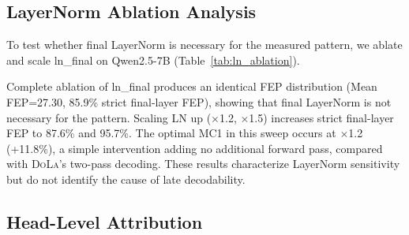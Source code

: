 \documentclass[11pt]{article}
\newcommand{\dola}{\textsc{DoLa}}
\begin{document}
\subsection{LayerNorm Ablation Analysis}
\label{sec:ln_ablation}

To test whether final LayerNorm is necessary for the measured pattern, we ablate and scale ln\_final on Qwen2.5-7B (Table~\ref{tab:ln_ablation}).

\begin{table}[t]
\centering
\small
{}
\caption{LayerNorm ablation (Qwen2.5-7B, 817 samples). Ablating ln\_final has \emph{zero} effect on FEP; LN$\times$1.2 yields +11.8\% MC1.\protect\footnotemark}
\label{tab:ln_ablation}
\end{table}

Complete ablation of ln\_final produces an identical FEP distribution (Mean FEP=27.30, 85.9\% strict final-layer FEP), showing that final LayerNorm is not necessary for the pattern. Scaling LN up ($\times$1.2, $\times$1.5) increases strict final-layer FEP to 87.6\% and 95.7\%. The optimal MC1 in this sweep occurs at $\times$1.2 (+11.8\%), a simple intervention adding no additional forward pass, compared with \dola{}'s two-pass decoding. These results characterize LayerNorm sensitivity but do not identify the cause of late decodability.

\subsection{Head-Level Attribution}
\label{sec:head_attribution}
\end{document}
